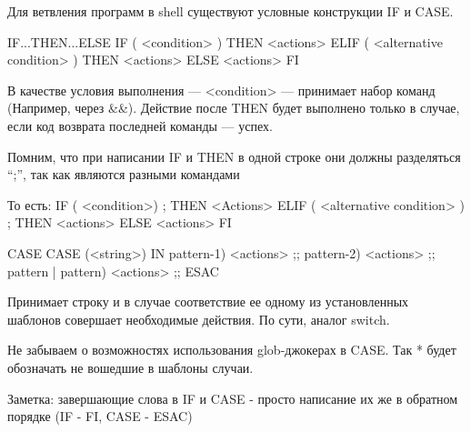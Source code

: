 Для ветвления программ в shell существуют условные конструкции IF и CASE.

\begin{shCode}{IF...THEN...ELSE}
	IF ( <condition> ) 
		THEN <actions>
	ELIF ( <alternative condition> ) 
		THEN <actions>
	ELSE 
		<actions>
	FI
\end{shCode}

В качестве условия выполнения --- <condition> --- принимает набор команд (Например, через  \&\&). Действие после THEN будет выполнено только в случае, если код возврата последней команды --- успех.

\begin{important}
	Помним, что при написании IF и THEN в одной строке они должны разделяться “;”, так как являются разными командами
\end{important}

\begin{shCode}{То есть:}
	IF ( <condition>) ; THEN <Actions>
	ELIF ( <alternative condition> ) ; THEN <actions>
	ELSE <actions>
	FI
\end{shCode}


\begin{shCode}{CASE}
	CASE (<string>) IN
     pattern-1)      
		<actions>
          	;;
     pattern-2)      
     	<actions>
          	;;
     pattern | pattern)
     	<actions>
          	;;
	ESAC
\end{shCode}

Принимает строку и в случае соответствие ее одному из установленных шаблонов совершает необходимые действия. По сути, аналог switch.

\begin{important}
	Не забываем о возможностях использования glob-джокерах в CASE. Так * будет обозначать не вошедшие в шаблоны случаи.
\end{important}

Заметка: завершающие слова в IF и CASE - просто написание их же в обратном порядке (IF - FI, CASE - ESAC)


